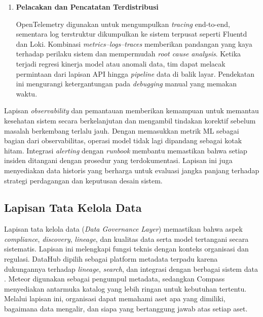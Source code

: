 \begin{enumerate}
    \vspace{0.5em}

    \item \textbf{Pelacakan dan Pencatatan Terdistribusi}  

    OpenTelemetry digunakan untuk mengumpulkan \textit{tracing} end-to-end, sementara log terstruktur dikumpulkan ke sistem terpusat seperti Fluentd dan Loki. Kombinasi \textit{metrics--logs--traces} memberikan pandangan yang kaya terhadap perilaku sistem dan mempermudah \textit{root cause analysis}. Ketika terjadi regresi kinerja model atau anomali data, tim dapat melacak permintaan dari lapisan API hingga \textit{pipeline} data di balik layar. Pendekatan ini mengurangi ketergantungan pada \textit{debugging} manual yang memakan waktu.

    \vspace{0.5em}
\end{enumerate}

Lapisan \textit{observability} dan pemantauan memberikan kemampuan untuk memantau kesehatan sistem secara berkelanjutan dan mengambil tindakan korektif sebelum masalah berkembang terlalu jauh. Dengan memasukkan metrik ML sebagai bagian dari observabilitas, operasi model tidak lagi dipandang sebagai kotak hitam. Integrasi \textit{alerting} dengan \textit{runbook} membantu memastikan bahwa setiap insiden ditangani dengan prosedur yang terdokumentasi. Lapisan ini juga menyediakan data historis yang berharga untuk evaluasi jangka panjang terhadap strategi perdagangan dan keputusan desain sistem.

\subsection{Lapisan Tata Kelola Data}

Lapisan tata kelola data (\textit{Data Governance Layer}) memastikan bahwa aspek \textit{compliance}, \textit{discovery}, \textit{lineage}, dan kualitas data serta model tertangani secara sistematis. Lapisan ini melengkapi fungsi teknis dengan konteks organisasi dan regulasi. DataHub dipilih sebagai platform metadata terpadu karena dukungannya terhadap \textit{lineage}, \textit{search}, dan integrasi dengan berbagai sistem data \autocite{datahub2024,lamer2024data}. Meteor digunakan sebagai pengumpul metadata, sedangkan Compass menyediakan antarmuka katalog yang lebih ringan untuk kebutuhan tertentu. Melalui lapisan ini, organisasi dapat memahami aset apa yang dimiliki, bagaimana data mengalir, dan siapa yang bertanggung jawab atas setiap aset.

